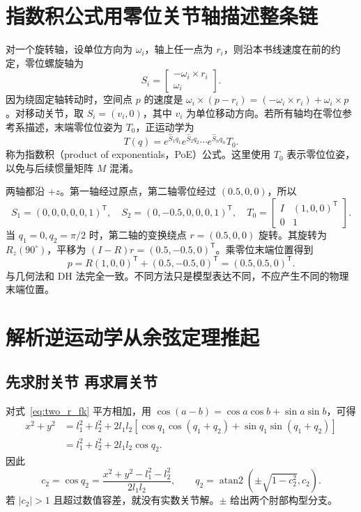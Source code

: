 \section{指数积公式用零位关节轴描述整条链}
对一个旋转轴，设单位方向为 $\omega_i$，轴上任一点为 $r_i$，则沿本书线速度在前的约定，零位螺旋轴为
\begin{equation}
 S_i=\begin{bmatrix}-\omega_i\times r_i\\\omega_i\end{bmatrix}.
\end{equation}
因为绕固定轴转动时，空间点 $p$ 的速度是 $\omega_i\times(p-r_i)=(-\omega_i\times r_i)+\omega_i\times p$。对移动关节，取 $S_i=(v_i,0)$，其中 $v_i$ 为单位移动方向。若所有轴均在零位参考系描述，末端零位位姿为 $T_0$，正运动学为
\begin{equation}
 T(q)=e^{\widehat S_1q_1}e^{\widehat S_2q_2}\cdots e^{\widehat S_nq_n}T_0.
\end{equation}
称为指数积（product of exponentials，PoE）公式。这里使用 $T_0$ 表示零位位姿，以免与后续惯量矩阵 $M$ 混淆。

\begin{examplebox}
两轴都沿 $+z$。第一轴经过原点，第二轴零位经过 $(0.5,0,0)$，所以
\[
 S_1=(0,0,0,0,0,1)^\mathsf T,
 \quad S_2=(0,-0.5,0,0,0,1)^\mathsf T,
 \quad T_0=\begin{bmatrix}I&(1,0,0)^\mathsf T\\0&1\end{bmatrix}.
\]
当 $q_1=0,q_2=\pi/2$ 时，第二轴的变换绕点 $r=(0.5,0,0)$ 旋转。其旋转为 $R_z(90^\circ)$，平移为 $(I-R)r=(0.5,-0.5,0)^\mathsf T$。乘零位末端位置得到
\[
 p=R(1,0,0)^\mathsf T+(0.5,-0.5,0)^\mathsf T=(0.5,0.5,0)^\mathsf T.
\]
与几何法和 DH 法完全一致。不同方法只是模型表达不同，不应产生不同的物理末端位置。
\end{examplebox}

\section{解析逆运动学从余弦定理推起}
\subsection{先求肘关节 再求肩关节}
对式~\eqref{eq:two_r_fk} 平方相加，用 $\cos(a-b)=\cos a\cos b+\sin a\sin b$，可得
\begin{align}
 x^2+y^2
 &=l_1^2+l_2^2
   +2l_1l_2[\cos q_1\cos(q_1+q_2)+\sin q_1\sin(q_1+q_2)]\\
 &=l_1^2+l_2^2+2l_1l_2\cos q_2.
\end{align}
因此
\begin{equation}
 c_2=\cos q_2=\frac{x^2+y^2-l_1^2-l_2^2}{2l_1l_2},
 \qquad
 q_2=\operatorname{atan2}\left(\pm\sqrt{1-c_2^2},c_2\right).
\end{equation}
若 $|c_2|>1$ 且超过数值容差，就没有实数关节解。$\pm$ 给出两个肘部构型分支。

